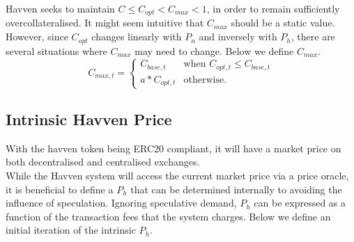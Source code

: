 \noindent Havven seeks to maintain $C \leq C_{opt} < C_{max} < 1$, in order to remain sufficiently overcollateralised. It might seem intuitive that $C_{max}$ should be a static value. However, since $C_{opt}$ changes linearly with $P_n$ and inversely with $P_h$, there are several situations where $C_{max}$ may need to change. Below we define $C_{max}$. \\

\begin{equation}
\label{eq:12}
C_{max,t} = 
\begin{cases}
 C_{base,t} &\mbox{when } C_{opt,t} \leq C_{base,t} \\[1em]
 a * C_{opt,t} &\mbox{otherwise}.
 \end{cases}
\end{equation}

\begin{center}
\end{center}

\newpage

\subsection{Intrinsic Havven Price} With the havven token being ERC20 compliant, it will have a market price on both decentralised and centralised exchanges. \\

\noindent While the Havven system will access the current market price via a price oracle, it is beneficial to define a $P_h$ that can be determined internally to avoiding the influence of speculation. Ignoring speculative demand, $P_h$ can be expressed as a function of the transaction fees that the system charges. Below we define an initial iteration of the intrinsic $P_h$.

